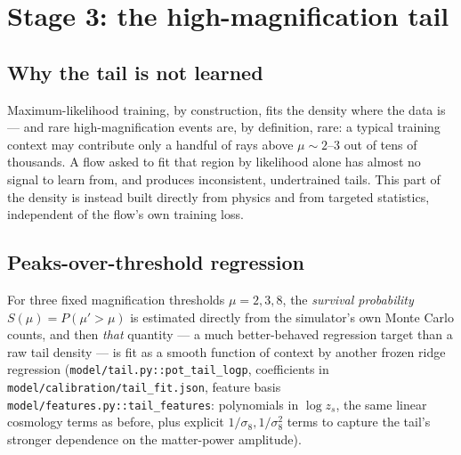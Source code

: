 \documentclass[11pt]{article}
\newcommand{\file}[1]{\texttt{#1}}
\begin{document}
\section{Stage 3: the high-magnification tail}
\label{sec:tail}

\subsection{Why the tail is not learned}

Maximum-likelihood training, by construction, fits the density where the
data is — and rare high-magnification events are, by definition, rare: a
typical training context may contribute only a handful of rays above
$\mu\sim2$--3 out of tens of thousands. A flow asked to fit that region by
likelihood alone has almost no signal to learn from, and produces
inconsistent, undertrained tails. This part of the density is instead
built directly from physics and from targeted statistics, independent of
the flow's own training loss.

\subsection{Peaks-over-threshold regression}

For three fixed magnification thresholds $\mu = 2,3,8$, the
\emph{survival probability} $S(\mu) = P(\mu' > \mu)$ is estimated directly
from the simulator's own Monte Carlo counts, and then \emph{that} quantity
— a much better-behaved regression target than a raw tail density — is
fit as a smooth function of context by another frozen ridge regression
(\file{model/tail.py::pot\_tail\_logp}, coefficients in
\file{model/calibration/tail\_fit.json}, feature basis
\file{model/features.py::tail\_features}: polynomials in $\log z_s$, the
same linear cosmology terms as before, plus explicit $1/\sigma_8,
1/\sigma_8^2$ terms to capture the tail's stronger dependence on the
matter-power amplitude).
\end{document}

